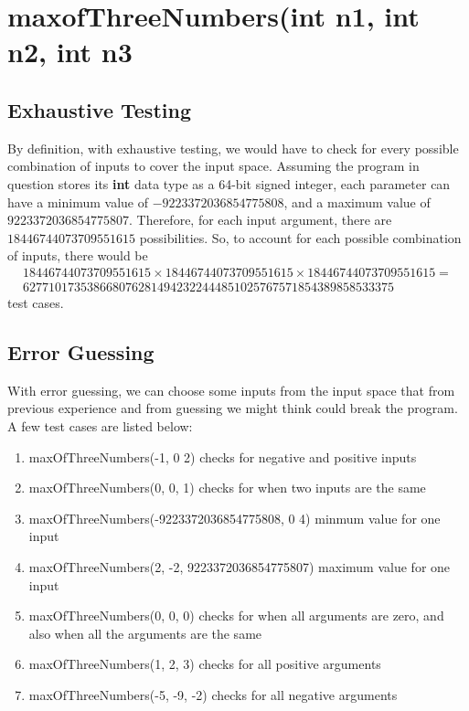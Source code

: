 \documentclass[letterpaper]{article}
\begin{document}
\section{maxofThreeNumbers(int n1, int n2, int n3}
\subsection{Exhaustive Testing}
By definition, with exhaustive testing, we would have to check for every
possible combination of inputs to cover the input space. 
Assuming the program in question stores its
\textbf{int} data type as a 64-bit signed integer, each parameter can
have a minimum value of $-9223372036854775808$, and a maximum value of
$9223372036854775807$. Therefore, for each input argument, there are
$18446744073709551615$ possibilities. So, to account for each possible
combination of inputs, there would be 
\begin{multline*}
18446744073709551615 \times 18446744073709551615 \times 18446744073709551615 = \\ 6277101735386680762814942322444851025767571854389858533375
\end{multline*}
test cases. 

\subsection{Error Guessing}
With error guessing, we can choose some inputs from the input space
that from previous experience and from guessing we might think could 
break the program. A few test cases are listed below:

\begin{enumerate}
	\item maxOfThreeNumbers(-1, 0 2) checks for negative and positive inputs
	\item maxOfThreeNumbers(0, 0, 1) checks for when two inputs are the same
	\item maxOfThreeNumbers(-9223372036854775808, 0 4) minmum value for one input
	\item maxOfThreeNumbers(2, -2, 9223372036854775807) maximum value for one input
	\item maxOfThreeNumbers(0, 0, 0) checks for when all arguments are zero, and also when all the arguments are the same
	\item maxOfThreeNumbers(1, 2, 3) checks for all positive arguments
	\item maxOfThreeNumbers(-5, -9, -2) checks for all negative arguments
\end{enumerate}

\section{}

\nocite{*}
\printbibliography
\end{document}
